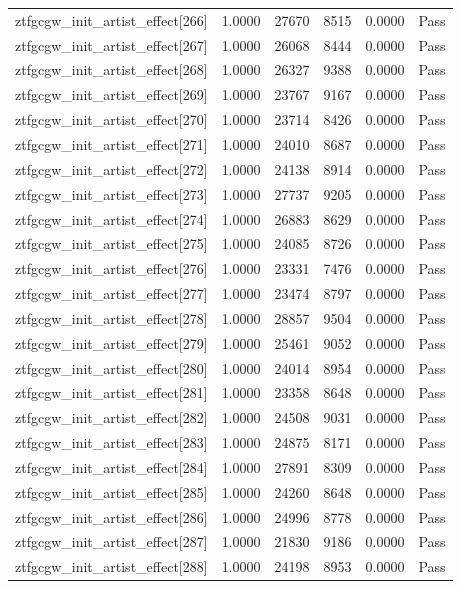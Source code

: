 \begin{table}[htbp]
\begin{tabular}{llrrll}
ztfgcgw\_init\_artist\_effect[266] & 1.0000 & 27670 & 8515 & 0.0000 & Pass \\
ztfgcgw\_init\_artist\_effect[267] & 1.0000 & 26068 & 8444 & 0.0000 & Pass \\
ztfgcgw\_init\_artist\_effect[268] & 1.0000 & 26327 & 9388 & 0.0000 & Pass \\
ztfgcgw\_init\_artist\_effect[269] & 1.0000 & 23767 & 9167 & 0.0000 & Pass \\
ztfgcgw\_init\_artist\_effect[270] & 1.0000 & 23714 & 8426 & 0.0000 & Pass \\
ztfgcgw\_init\_artist\_effect[271] & 1.0000 & 24010 & 8687 & 0.0000 & Pass \\
ztfgcgw\_init\_artist\_effect[272] & 1.0000 & 24138 & 8914 & 0.0000 & Pass \\
ztfgcgw\_init\_artist\_effect[273] & 1.0000 & 27737 & 9205 & 0.0000 & Pass \\
ztfgcgw\_init\_artist\_effect[274] & 1.0000 & 26883 & 8629 & 0.0000 & Pass \\
ztfgcgw\_init\_artist\_effect[275] & 1.0000 & 24085 & 8726 & 0.0000 & Pass \\
ztfgcgw\_init\_artist\_effect[276] & 1.0000 & 23331 & 7476 & 0.0000 & Pass \\
ztfgcgw\_init\_artist\_effect[277] & 1.0000 & 23474 & 8797 & 0.0000 & Pass \\
ztfgcgw\_init\_artist\_effect[278] & 1.0000 & 28857 & 9504 & 0.0000 & Pass \\
ztfgcgw\_init\_artist\_effect[279] & 1.0000 & 25461 & 9052 & 0.0000 & Pass \\
ztfgcgw\_init\_artist\_effect[280] & 1.0000 & 24014 & 8954 & 0.0000 & Pass \\
ztfgcgw\_init\_artist\_effect[281] & 1.0000 & 23358 & 8648 & 0.0000 & Pass \\
ztfgcgw\_init\_artist\_effect[282] & 1.0000 & 24508 & 9031 & 0.0000 & Pass \\
ztfgcgw\_init\_artist\_effect[283] & 1.0000 & 24875 & 8171 & 0.0000 & Pass \\
ztfgcgw\_init\_artist\_effect[284] & 1.0000 & 27891 & 8309 & 0.0000 & Pass \\
ztfgcgw\_init\_artist\_effect[285] & 1.0000 & 24260 & 8648 & 0.0000 & Pass \\
ztfgcgw\_init\_artist\_effect[286] & 1.0000 & 24996 & 8778 & 0.0000 & Pass \\
ztfgcgw\_init\_artist\_effect[287] & 1.0000 & 21830 & 9186 & 0.0000 & Pass \\
ztfgcgw\_init\_artist\_effect[288] & 1.0000 & 24198 & 8953 & 0.0000 & Pass \\

\end{tabular}
\end{table}
